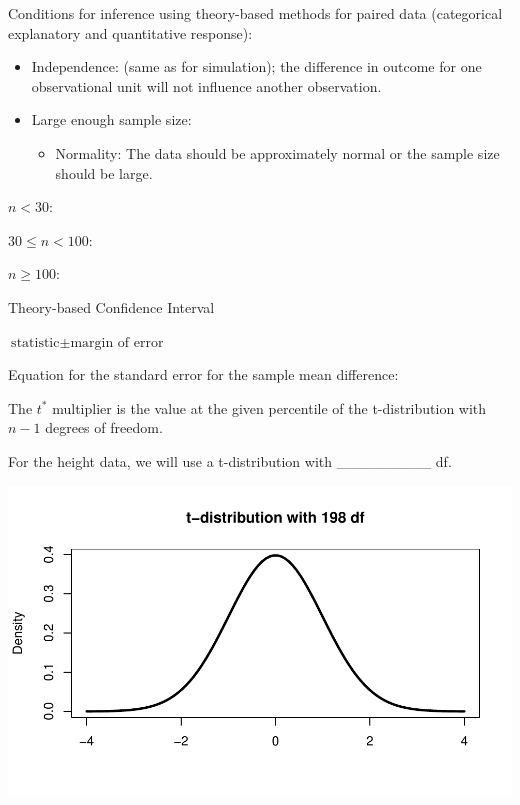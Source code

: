 \documentclass[
]{report}
\providecommand{\tightlist}{%
  \setlength{\itemsep}{0pt}\setlength{\parskip}{0pt}}
\newcommand{\rgi}{\hspace{24pt}}  %
\begin{document}

Conditions for inference using theory-based methods for paired data (categorical explanatory and quantitative response):

\begin{itemize}
\item
  Independence: (same as for simulation); the difference in outcome for one observational unit will not influence another observation.
\item
  Large enough sample size:

  \begin{itemize}
  \tightlist
  \item
    Normality: The data should be approximately normal or the sample size should be large.
  \end{itemize}
\end{itemize}

\rgi \rgi \(n < 30\):

\vspace{0.2in}

\rgi \rgi \(30 \leq n < 100\):

\vspace{0.2in}

\rgi \rgi \(n \geq 100\):

\vspace{0.2in}

Theory-based Confidence Interval

\rgi \(\text{statistic} \pm \text{margin of error}\)

\vspace{0.5in}

Equation for the standard error for the sample mean difference:

\vspace{0.5in}

The \(t^*\) multiplier is the value at the given percentile of the t-distribution with \(n - 1\) degrees of freedom.

For the height data, we will use a t-distribution with \_\_\_\_\_\_\_\_\_ df.

\begin{center}\includegraphics[width=0.7\linewidth]{11-LN011-paired_files/figure-latex/tstar-1} \end{center}
\end{document}
